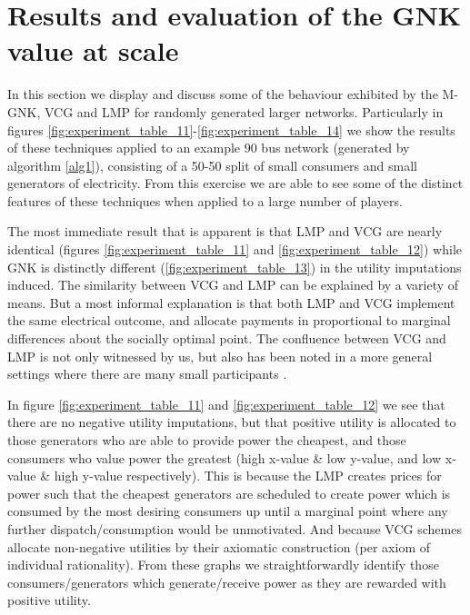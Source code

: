 



\section{Results and evaluation of the GNK value at scale}\label{sec:results_and_evaluation_of_GNK}



In this section we display and discuss some of the behaviour exhibited by the M-GNK, VCG and LMP for randomly generated larger networks.
Particularly in figures \ref{fig:experiment_table_11}-\ref{fig:experiment_table_14} we show the results of these techniques applied to an example 90 bus network (generated by algorithm \ref{alg1}), consisting of a 50-50 split of small consumers and small generators of electricity.
From this exercise we are able to see some of the distinct features of these techniques when applied to a large number of players.

The most immediate result that is apparent is that LMP and VCG are nearly identical (figures \ref{fig:experiment_table_11} and \ref{fig:experiment_table_12}) while GNK is distinctly different (\ref{fig:experiment_table_13}) in the utility imputations induced.
The similarity between VCG and LMP can be explained by a variety of means.
But a most informal explanation is that both LMP and VCG implement the same electrical outcome, and allocate payments in proportional to marginal differences about the socially optimal point.
The confluence between VCG and LMP is not only witnessed by us, but also has been noted in a more general settings where there are many small participants \cite{NATH2019673, 8430852}.%

In figure \ref{fig:experiment_table_11} and \ref{fig:experiment_table_12} we see that there are no negative utility imputations, but that positive utility is allocated to those generators who are able to provide power the cheapest, and those consumers who value power the greatest (high x-value \& low y-value, and low x-value \& high y-value respectively).
This is because the LMP creates prices for power such that the cheapest generators are scheduled to create power which is consumed by the most desiring consumers up until a marginal point where any further dispatch/consumption would be unmotivated.
And because VCG schemes allocate non-negative utilities by their axiomatic construction (per axiom of individual rationality).
From these graphs we straightforwardly identify those consumers/generators which generate/receive power as they are rewarded with positive utility.

